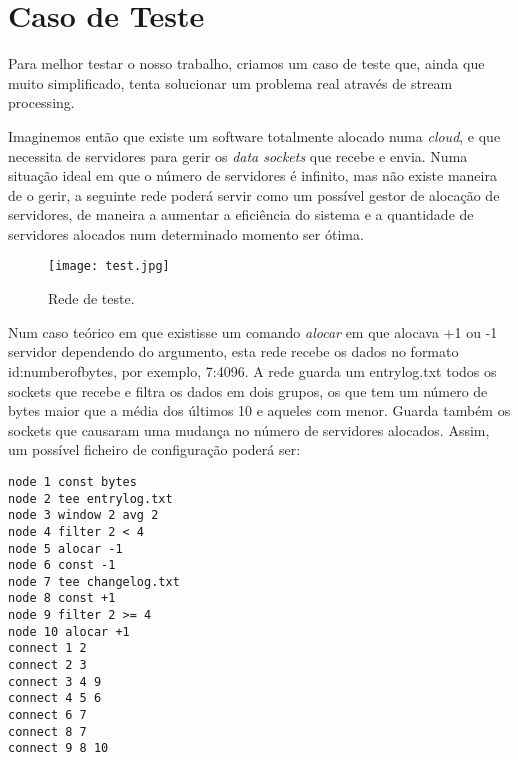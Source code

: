 \documentclass{article}
\begin{document}
\clearpage

\section{Caso de Teste}
\par Para melhor testar o nosso trabalho, criamos um caso de teste que, ainda que muito simplificado, tenta solucionar um problema real através de stream processing.
\par Imaginemos então que existe um software totalmente alocado numa \emph{cloud}, e que necessita de servidores para gerir os \emph{data sockets} que recebe e envia. Numa situação ideal em que o número de servidores é infinito, mas não existe maneira de o gerir, a seguinte rede poderá servir como um possível gestor de alocação de servidores, de maneira a aumentar a eficiência do sistema e a quantidade de servidores alocados num determinado momento ser ótima.

\begin{figure}[ht]
\centering
\texttt{[image: test.jpg]}
\caption{Rede de teste.}
\end{figure}

\par Num caso teórico em que existisse um comando \emph{alocar} em que alocava +1 ou -1 servidor dependendo do argumento, esta rede recebe os dados no formato id:numberofbytes, por exemplo, 7:4096. A rede guarda um entrylog.txt todos os sockets que recebe e filtra os dados em dois grupos, os que tem um número de bytes maior que a média dos últimos 10 e aqueles com menor. Guarda também os sockets que causaram uma mudança no número de servidores alocados. Assim, um possível ficheiro de configuração poderá ser:

\begin{verbatim}
node 1 const bytes
node 2 tee entrylog.txt
node 3 window 2 avg 2
node 4 filter 2 < 4
node 5 alocar -1
node 6 const -1
node 7 tee changelog.txt
node 8 const +1
node 9 filter 2 >= 4
node 10 alocar +1
connect 1 2
connect 2 3
connect 3 4 9
connect 4 5 6
connect 6 7
connect 8 7
connect 9 8 10
\end{verbatim}
\end{document}
